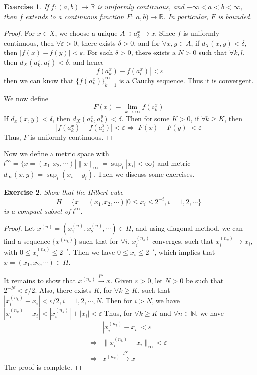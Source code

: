 \documentclass[12pt,leqno]{amsart}
\newtheorem{exercise}{Exercise}[section]
\theoremstyle{definition}
\numberwithin{equation}{subsection}
\begin{document}
\begin{exercise}
If $f:(a,b)\to\mathbb{R}$ is uniformly continuous, and $-\infty < a < b < \infty$, then $f$ extends to a continuous function $F:[a,b)\to\mathbb{R}$. In particular, $F$ is bounded.
\end{exercise}

\begin{proof}
For $x\in X$, we choose a unique $A\ni a_k^x\to x$. Since $f$ is uniformly continuous, then $\forall\varepsilon > 0$, there exists $\delta > 0$, and for $\forall x,y\in A$, if $d_X(x,y) < \delta$, then $|f(x) - f(y)| < \varepsilon$. For such $\delta > 0$, there exists a $N > 0$ such that $\forall k,l$, then $d_X(a_k^x, a_l^x) < \delta$, and hence $$|f(a_k^x) - f(a_l^x)| < \varepsilon$$
then we can know that $\{f(a_k^x)\}^\infty_{k=1}$ is a Cauchy sequence. Thus it is convergent. 

We now define $$F(x) = \lim_{k\to\infty}f(a_k^x)$$
If $d_x(x,y) < \delta$, then $d_X(a_k^x,a_k^y) < \delta$. Then for some $K > 0$, if $\forall k \geq K$, then $$|f(a_k^x) - f(a_k^y)| < \varepsilon \Rightarrow |F(x) - F(y)| < \varepsilon$$
Thus, $F$ is uniformly continuous.
\end{proof}

\medskip

Now we define a metric space with $l^\infty = \{x = (x_1,x_2,\cdots) | \|x\|_\infty = \sup_i |x_i| < \infty\}$ and metric $d_\infty(x,y) = \sup_i (x_i - y_i)$. Then we discuss some exercises. 

\begin{exercise}
Show that the Hilbert cube 
$$H = \{x = (x_1,x_2,\cdots) | 0\leq x_i \leq 2^{-i}, i = 1,2,\cdots\}$$
is a compact subset of $l^\infty$.
\end{exercise}
\begin{proof}
Let $x^{(n)} = \left(x_1^{(n)},x_2^{(n)},\cdots \right)\in H$, and using diagonal method, we can find a sequence $\{x^{(n_k)}\}$ such that for $\forall i$, $x_i^{(n_k)}$ converges, such that $x_i^{(n_k)}\to x_i$, with $0\leq x_i^{(n_k)}\leq 2^{-i}$. Then we have $0\leq x_i\leq 2^{-i}$, which implies that $x = \left(x_1, x_2, \cdots \right)\in H$. 

It remains to show that $x^{(n_k)}\stackrel{l^\infty}{\longrightarrow}x$. Given $\varepsilon > 0$, let $N > 0$ be such that $2^{-N} < \varepsilon/2$. Also, there exists $K$, for $\forall k \geq K$, such that $\left|x_i^{(n_k)} - x_i\right| < \varepsilon/2, i = 1,2,\cdots, N$. Then for $i > N$, we have 
$\left|x_i^{(n_k)} - x_i\right| < \left|x_i^{(n_k)}\right| + |x_i| < \varepsilon$
Thus, for $\forall k \geq K$ and $\forall n\in \mathbb{N}$, we have 
\begin{align*}
    & \left|x_i^{(n_k)} - x_i\right| < \varepsilon \\
    \Rightarrow & \|x_i^{(n_k)} - x_i\|_\infty < \varepsilon \\
    \Rightarrow & x^{(n_k)}\stackrel{l^\infty}{\longrightarrow}x
\end{align*}
The proof is complete.
\end{proof}
\end{document}
